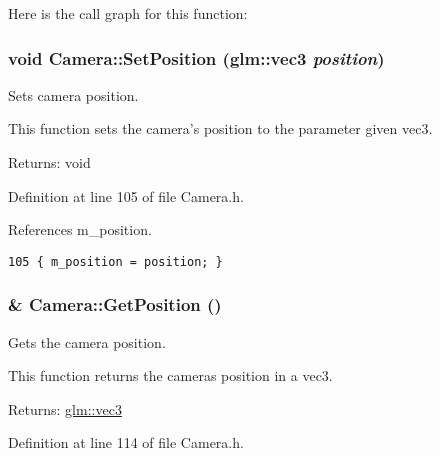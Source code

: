 Here is the call graph for this function:\hypertarget{class_camera_513c43647fdc22a1f1f2ce75d67e6c43}{
\subsubsection[SetPosition]{\setlength{\rightskip}{0pt plus 5cm}void Camera::SetPosition ({\bf glm::vec3} {\em position})}}
\label{class_camera_513c43647fdc22a1f1f2ce75d67e6c43}


Sets camera position. 

This function sets the camera's position to the parameter given vec3.

\begin{Desc}
\item[Returns:]void \end{Desc}


Definition at line 105 of file Camera.h.

References m\_\-position.

\begin{Code}\begin{verbatim}105 { m_position = position; }
\end{verbatim}
\end{Code}


\hypertarget{class_camera_0eabfe3e807623f2ff69b121e65d8b8e}{
\subsubsection[GetPosition]{\& Camera::GetPosition ()}}
\label{class_camera_0eabfe3e807623f2ff69b121e65d8b8e}


Gets the camera position. 

This function returns the cameras position in a vec3.

\begin{Desc}
\item[Returns:]\hyperlink{group__core__types_g1c47e8b3386109bc992b6c48e91b0be7}{glm::vec3} \end{Desc}


Definition at line 114 of file Camera.h.


